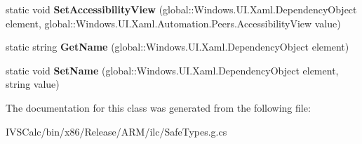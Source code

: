 \begin{DoxyCompactItemize}
static void {\bfseries Set\+Accessibility\+View} (global\+::\+Windows.\+U\+I.\+Xaml.\+Dependency\+Object element, global\+::\+Windows.\+U\+I.\+Xaml.\+Automation.\+Peers.\+Accessibility\+View value)
\item 
\mbox{\label{class_windows_1_1_u_i_1_1_xaml_1_1_automation_1_1_automation_properties_a467b1c94670b22d8bd778de6351a09b5}} 
static string {\bfseries Get\+Name} (global\+::\+Windows.\+U\+I.\+Xaml.\+Dependency\+Object element)
\item 
\mbox{\label{class_windows_1_1_u_i_1_1_xaml_1_1_automation_1_1_automation_properties_a4f2659d7e86be152ef660f9c7e6fd422}} 
static void {\bfseries Set\+Name} (global\+::\+Windows.\+U\+I.\+Xaml.\+Dependency\+Object element, string value)
\end{DoxyCompactItemize}


The documentation for this class was generated from the following file\+:\begin{DoxyCompactItemize}
\item 
I\+V\+S\+Calc/bin/x86/\+Release/\+A\+R\+M/ilc/Safe\+Types.\+g.\+cs\end{DoxyCompactItemize}
